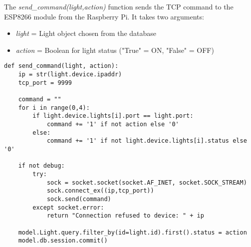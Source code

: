 The \textit{send\_command(light,action)} function sends the TCP command to the ESP8266 module from the Raspberry Pi. It takes two arguments:
\begin{itemize}
\item \textit{light} = Light object chosen from the database
\item \textit{action} = Boolean for light status ("True" = ON, "False" = OFF)
\end{itemize}
\begin{lstlisting}
def send_command(light, action):
    ip = str(light.device.ipaddr)
    tcp_port = 9999

    command = ""
    for i in range(0,4):
        if light.device.lights[i].port == light.port:
            command += '1' if not action else '0'
        else:
            command += '1' if not light.device.lights[i].status else '0'

    if not debug:
        try:
            sock = socket.socket(socket.AF_INET, socket.SOCK_STREAM)
            sock.connect_ex((ip,tcp_port))
            sock.send(command)
        except socket.error:
            return "Connection refused to device: " + ip

    model.Light.query.filter_by(id=light.id).first().status = action
    model.db.session.commit()
\end{lstlisting}
